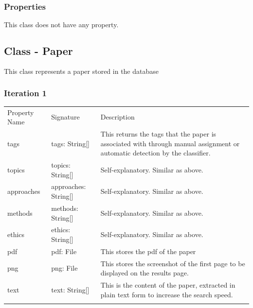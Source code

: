 \documentclass[
]{article}
\begin{document}
\hypertarget{properties}{%
\subsubsection{Properties}\label{properties}}

This class does not have any property.

\hypertarget{class---paper}{%
\subsection{Class - Paper}\label{class---paper}}

This class represents a paper stored in the database

\hypertarget{iteration-1-4}{%
\subsubsection{Iteration 1}\label{iteration-1-4}}

\begin{longtable}[]{@{}
  >{\raggedright\arraybackslash}p{}
  >{\raggedright\arraybackslash}p{}
  >{\raggedright\arraybackslash}p{}@{}}
\toprule
Property Name & Signature & Description \\ \addlinespace
\midrule
\endhead
tags & tags: String{[}{]} & This returns the tags that the paper is
associated with through manual assignment or automatic detection by the
classifier. \\ \addlinespace
topics & topics: String{[}{]} & Self-explanatory. Similar as
above. \\ \addlinespace
approaches & approaches: String{[}{]} & Self-explanatory. Similar as
above. \\ \addlinespace
methods & methods: String{[}{]} & Self-explanatory. Similar as
above. \\ \addlinespace
ethics & ethics: String{[}{]} & Self-explanatory. Similar as
above. \\ \addlinespace
pdf & pdf: File & This stores the pdf of the paper \\ \addlinespace
png & png: File & This stores the screenshot of the first page to be
displayed on the results page. \\ \addlinespace
text & text: String{[}{]} & This is the content of the paper, extracted
in plain text form to increase the search speed. \\ \addlinespace
\bottomrule
\end{longtable}
\end{document}
